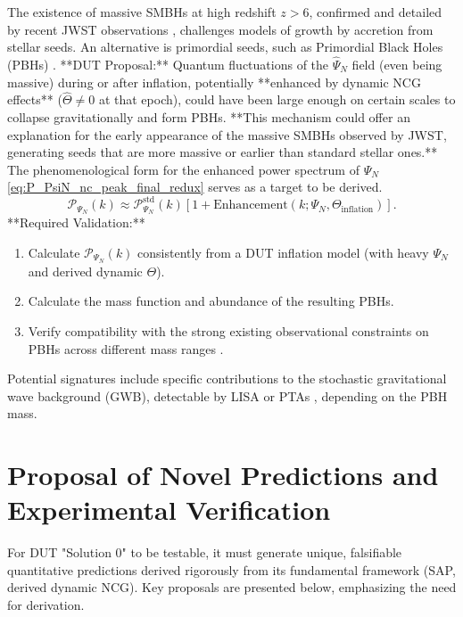 \documentclass[11pt, a4paper]{article}
\theoremstyle{remark}
\newcommand{\Op}[1]{\hat{#1}}
\begin{document}
The existence of massive SMBHs at high redshift \(z > 6\), confirmed and detailed by recent JWST observations \citep[e.g.,][]{Labbe:2023}, challenges models of growth by accretion from stellar seeds. An alternative is primordial seeds, such as Primordial Black Holes (PBHs) \citep{CarrHawking1974PBH}.
**DUT Proposal:** Quantum fluctuations of the \( \Op{\Psi}_N \) field (even being massive) during or after inflation, potentially **enhanced by dynamic NCG effects** (\( \Op{\Theta} \neq 0 \) at that epoch), could have been large enough on certain scales to collapse gravitationally and form PBHs. **This mechanism could offer an explanation for the early appearance of the massive SMBHs observed by JWST, generating seeds that are more massive or earlier than standard stellar ones.** The phenomenological form for the enhanced power spectrum of \( \Psi_N \) \eqref{eq:P_PsiN_nc_peak_final_redux} serves as a target to be derived.
\begin{equation} \label{eq:P_PsiN_nc_peak_final_redux}
\mathcal{P}_{\Psi_N}(k) \approx \mathcal{P}_{\Psi_N}^{\text{std}}(k) \left[ 1 + \text{Enhancement}(k; \Psi_N, \Theta_{\text{inflation}}) \right].
\end{equation}
**Required Validation:**
\begin{enumerate}
    \item Calculate \( \mathcal{P}_{\Psi_N}(k) \) consistently from a DUT inflation model (with heavy \( \Psi_N \) and derived dynamic \( \Theta \)).
    \item Calculate the mass function and abundance of the resulting PBHs.
    \item Verify compatibility with the strong existing observational constraints on PBHs across different mass ranges \citep{Carr:2020gox}.
\end{enumerate}
Potential signatures include specific contributions to the stochastic gravitational wave background (GWB), detectable by LISA \citep{LISA:2017, Auclair2023LISA} or PTAs \citep{NANOGrav:2023gor}, depending on the PBH mass.

\section{Proposal of Novel Predictions and Experimental Verification}
\label{sec:novel_predictions_final_revised}

For DUT "Solution 0" to be testable, it must generate unique, falsifiable quantitative predictions derived rigorously from its fundamental framework (SAP, derived dynamic NCG). Key proposals are presented below, emphasizing the need for derivation.
\end{document}
